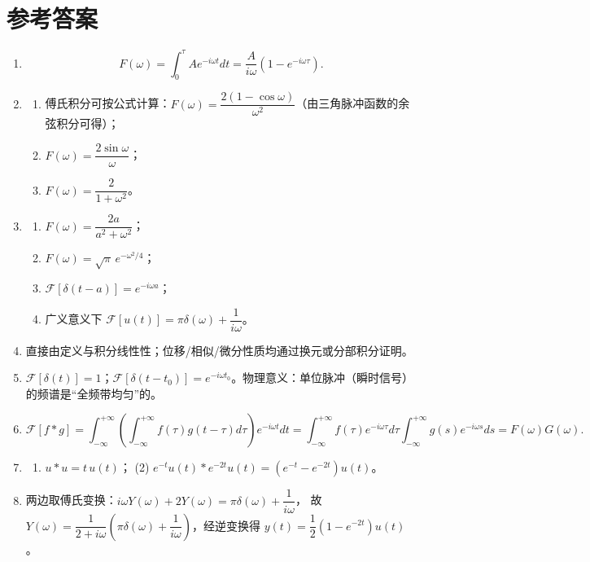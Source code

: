 \section{参考答案}\label{ux53c2ux8003ux7b54ux6848-6}

\begin{enumerate}
\def\labelenumi{\arabic{enumi}.}
\item
  \[
  F(\omega)=\int_0^\tau Ae^{-i\omega t}dt=\frac{A}{i\omega}\left(1-e^{-i\omega\tau}\right).
  \]
\item
  \begin{enumerate}
  \def\labelenumii{(\arabic{enumii})}
  \tightlist
  \item
    傅氏积分可按公式计算：\(F(\omega)=\dfrac{2(1-\cos\omega)}{\omega^2}\)（由三角脉冲函数的余弦积分可得）；
  \item
    \(F(\omega)=\dfrac{2\sin\omega}{\omega}\)；
  \item
    \(F(\omega)=\dfrac{2}{1+\omega^2}\)。
  \end{enumerate}
\item
  \begin{enumerate}
  \def\labelenumii{(\arabic{enumii})}
  \tightlist
  \item
    \(F(\omega)=\dfrac{2a}{a^2+\omega^2}\)；
  \item
    \(F(\omega)=\sqrt{\pi}\,e^{-\omega^2/4}\)；
  \item
    \(\mathcal F[\delta(t-a)]=e^{-i\omega a}\)；
  \item
    广义意义下
    \(\mathcal F[u(t)]=\pi\delta(\omega)+\dfrac{1}{i\omega}\)。
  \end{enumerate}
\item
  直接由定义与积分线性性；位移/相似/微分性质均通过换元或分部积分证明。
\item
  \(\mathcal F[\delta(t)]=1\)；\(\mathcal F[\delta(t-t_0)]=e^{-i\omega t_0}\)。物理意义：单位脉冲（瞬时信号）的频谱是``全频带均匀''的。
\item
  \[
  \mathcal F[f*g]=\int_{-\infty}^{+\infty}\left(\int_{-\infty}^{+\infty}f(\tau)g(t-\tau)d\tau\right)e^{-i\omega t}dt
  =\int_{-\infty}^{+\infty}f(\tau)e^{-i\omega\tau}d\tau\int_{-\infty}^{+\infty}g(s)e^{-i\omega s}ds=F(\omega)G(\omega).
  \]
\item
  \begin{enumerate}
  \def\labelenumii{(\arabic{enumii})}
  \tightlist
  \item
    \(u*u=t\,u(t)\)； (2)
    \(e^{-t}u(t)*e^{-2t}u(t)=\left(e^{-t}-e^{-2t}\right)u(t)\)。
  \end{enumerate}
\item
  两边取傅氏变换：\(i\omega Y(\omega)+2Y(\omega)=\pi\delta(\omega)+\dfrac1{i\omega}\)，
  故
  \(Y(\omega)=\dfrac{1}{2+i\omega}\left(\pi\delta(\omega)+\dfrac1{i\omega}\right)\)，经逆变换得
  \(y(t)=\dfrac12\left(1-e^{-2t}\right)u(t)\)。
\end{enumerate}
